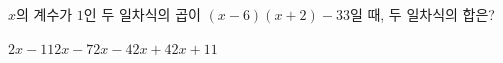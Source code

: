$x$의 계수가 $1$인 두 일차식의 곱이 $(x-6)(x+2)-33$일 때, 두 일차식의 합은?
\begin{choices32}{$2x-11$}{$2x-7$}{$2x-4$}{$2x+4$}{$2x+11$}\end{choices32}
